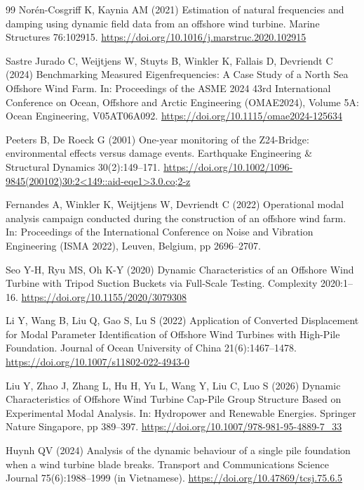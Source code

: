 \documentclass[11pt]{article}
\begin{document}
\begin{thebibliography}{99}
Nor{\'e}n-Cosgriff K, Kaynia AM (2021) Estimation of natural frequencies and damping using dynamic field data from an offshore wind turbine. Marine Structures 76:102915. \url{https://doi.org/10.1016/j.marstruc.2020.102915}

Sastre Jurado C, Weijtjens W, Stuyts B, Winkler K, Fallais D, Devriendt C (2024) Benchmarking Measured Eigenfrequencies: A Case Study of a North Sea Offshore Wind Farm. In: Proceedings of the ASME 2024 43rd International Conference on Ocean, Offshore and Arctic Engineering (OMAE2024), Volume 5A: Ocean Engineering, V05AT06A092. \url{https://doi.org/10.1115/omae2024-125634}

Peeters B, De Roeck G (2001) One-year monitoring of the Z24-Bridge: environmental effects versus damage events. Earthquake Engineering \& Structural Dynamics 30(2):149--171. \url{https://doi.org/10.1002/1096-9845(200102)30:2<149::aid-eqe1>3.0.co;2-z}

Fernandes A, Winkler K, Weijtjens W, Devriendt C (2022) Operational modal analysis campaign conducted during the construction of an offshore wind farm. In: Proceedings of the International Conference on Noise and Vibration Engineering (ISMA 2022), Leuven, Belgium, pp 2696--2707.

Seo Y-H, Ryu MS, Oh K-Y (2020) Dynamic Characteristics of an Offshore Wind Turbine with Tripod Suction Buckets via Full-Scale Testing. Complexity 2020:1--16. \url{https://doi.org/10.1155/2020/3079308}

Li Y, Wang B, Liu Q, Gao S, Lu S (2022) Application of Converted Displacement for Modal Parameter Identification of Offshore Wind Turbines with High-Pile Foundation. Journal of Ocean University of China 21(6):1467--1478. \url{https://doi.org/10.1007/s11802-022-4943-0}

Liu Y, Zhao J, Zhang L, Hu H, Yu L, Wang Y, Liu C, Luo S (2026) Dynamic Characteristics of Offshore Wind Turbine Cap-Pile Group Structure Based on Experimental Modal Analysis. In: Hydropower and Renewable Energies. Springer Nature Singapore, pp 389--397. \url{https://doi.org/10.1007/978-981-95-4889-7_33}

Huynh QV (2024) Analysis of the dynamic behaviour of a single pile foundation when a wind turbine blade breaks. Transport and Communications Science Journal 75(6):1988--1999 (in Vietnamese). \url{https://doi.org/10.47869/tcsj.75.6.5}


\end{thebibliography}
\end{document}
